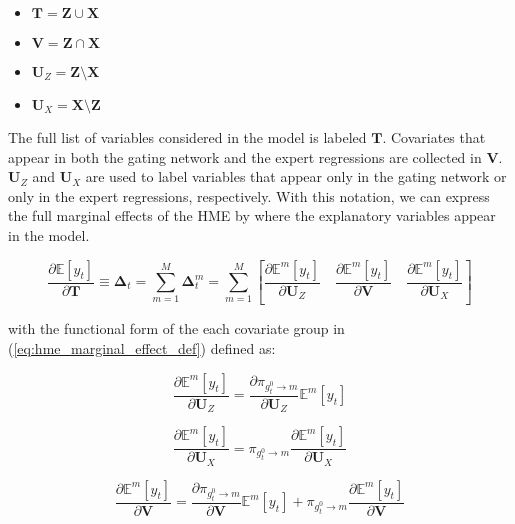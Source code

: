 \documentclass[12pt]{article}
\newcommand{\gateprod}[2]{\pi_{#1 \longrightarrow #2}}
\newcommand{\Eym}{\mathbb{E}^{m} \left[ y_{t} \right]}
\theoremstyle{definition}
\begin{document}
\begin{itemize}  
  \item $\boldsymbol{T} = \boldsymbol{Z} \cup \boldsymbol{X}$
  \item $\boldsymbol{V} = \boldsymbol{Z} \cap \boldsymbol{X}$
  \item $\boldsymbol{U}_{Z} = \boldsymbol{Z} \setminus \boldsymbol{X}$
  \item $\boldsymbol{U}_{X} = \boldsymbol{X} \setminus \boldsymbol{Z}$
\end{itemize}


The full list of variables considered in the model is labeled $\boldsymbol{T}$.
Covariates that appear in both the gating network and the expert regressions
are collected in $\boldsymbol{V}$. $\boldsymbol{U}_{Z}$ and $\boldsymbol{U}_{X}$ are
used to label variables that appear only in the gating network or only in the expert
regressions, respectively. With this notation, we can express the full marginal effects
of the HME by where the explanatory variables appear in the model.

\begin{equation} \label{eq:hme_marginal_effect_def}
  \frac{\partial \mathbb{E} \left[y_{t}\right]}{\partial \boldsymbol{T}} \equiv \boldsymbol{\Delta}_{t} = \sum_{m=1}^{M} \boldsymbol{\Delta}^{m}_{t} = \sum_{m=1}^{M} \left[ \frac{\partial \Eym}{\partial \boldsymbol{U}_{Z}}   \quad   \frac{\partial \Eym}{\partial \boldsymbol{V}}   \quad   \frac{\partial \Eym}{\partial \boldsymbol{U}_{X}}   \right]
\end{equation}

with the functional form of the each covariate group in (\ref{eq:hme_marginal_effect_def})
defined as:

\begin{equation} \label{eq:ME_gating}
  \frac{\partial \Eym}{\partial \boldsymbol{U}_{Z}} = \frac{\partial \gateprod{g^{0}_{t}}{m}}{{\partial \boldsymbol{U}_{Z}}} \Eym
\end{equation}


\begin{equation} \label{eq:ME_expert}
  \frac{\partial \Eym}{\partial \boldsymbol{U}_{X}} = \gateprod{g^{0}_{t}}{m} \frac{\partial \Eym}{{\partial \boldsymbol{U}_{X}}}
\end{equation}


\begin{equation} \label{eq:ME_both}
  \frac{\partial \Eym}{\partial \boldsymbol{V}} = \frac{\partial \gateprod{g^{0}_{t}}{m}}{{\partial \boldsymbol{V}}} \Eym + \gateprod{g^{0}_{t}}{m} \frac{\partial \Eym}{{\partial \boldsymbol{V}}}
\end{equation}
\end{document}
